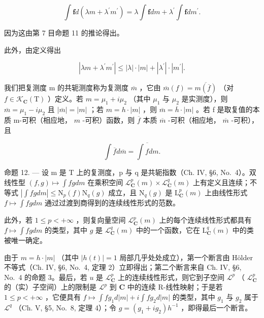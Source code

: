 \[
\int \mathbf {f} d (\lambda m + \lambda^ {\prime} m ^ {\prime}) = \lambda \int \mathbf {f} d m + \lambda^ {\prime} \int \mathbf {f} d m ^ {\prime}.
\]

因为这由第 7 目命题 11 的推论得出。

此外，由定义得出

\[
\left| \lambda m + \lambda^ {\prime} m ^ {\prime} \right| \leqslant \left| \lambda \right| \cdot \left| m \right| + \left| \lambda^ {\prime} \right| \cdot \left| m ^ {\prime} \right|.
\]

我们把复测度 m 的共轭测度称为复测度 \(\overline{m}\) ，它由 \(\overline{m}(f) = \overline{m(\overline{f})}\) （对 \(f \in \mathcal{K}_{\mathbf{C}}(\mathrm{T})\) ）定义。若 \(m = \mu_{1} + i\mu_{2}\) （其中 \(\mu_{1}\) 与 \(\mu_{2}\) 是实测度），则 \(\overline{m} = \mu_{1} - i\mu_{2}\) 且 \(|\overline{m}| = |m|\) ；若 \(m = h \cdot |m|\) ，则 \(\overline{m} = \overline{h} \cdot |m|\) 。若 f 是取复值的本质 m-可积（相应地， \(m\) -可积）函数，则 \(\overline{f}\) 本质 \(\overline{m}\) -可积（相应地， \(\overline{m}\) -可积），且

\[
\int \overline {{f}} d \overline {{m}} = \overline {{\int f d m}}.
\]

命题 12. --- 设 m 是 T 上的复测度，p 与 q 是共轭指数（Ch. IV, §6, No.~4）。双线性型 \((f,g)\mapsto\int fg dm\) 在乘积空间 \(\mathcal{L}_{\mathbf{C}}^{p}(m)\times\mathcal{L}_{\mathbf{C}}^{q}(m)\) 上有定义且连续；不等式 \(\left|\int fg dm\right|\leqslant\mathrm{N}_{p}(f)\mathrm{N}_{q}(g)\) 成立，且 \(\mathrm{N}_{q}(g)\) 是 \(\mathrm{L}_{\mathbf{C}}^{p}(m)\) 上由线性形式 \(f\mapsto\int fg dm\) 通过过渡到商得到的连续线性形式的范数。

此外，若 \(1 \leqslant p < +\infty\) ，则复向量空间 \(\mathcal{L}_{\mathbf{C}}^{p}(m)\) 上的每个连续线性形式都具有 \(f \mapsto \int fg dm\) 的类型，其中 \(g\) 是 \(\mathcal{L}_{\mathbf{C}}^{q}(m)\) 中的一个函数，它在 \(\mathrm{L}_{\mathbf{C}}^{q}(m)\) 中的类被唯一确定。

由于 \(m = h \cdot |m|\) （其中 \(|h(t)| = 1\) 局部几乎处处成立），第一个断言由 Hölder 不等式（Ch. IV, §6, No.~4, 定理 2）立即得出；第二个断言来自 Ch. IV, §6, No.~4 的命题 3。最后，若 \(u\) 是 \(\mathcal{L}_{\mathbf{C}}^{p}\) 上的连续线性形式，则它到子空间 \(\mathcal{L}^p\) （ \(\mathcal{L}_{\mathbf{C}}^{p}\) 的（实）子空间）上的限制是 \(\mathcal{L}^p\) 到 \(\mathbf{C}\) 中的连续 R-线性映射；于是若 \(1 \leqslant p < +\infty\) ，它便具有 \(f \mapsto \int fg_1 d|m| + i \int fg_2 d|m|\) 的类型，其中 \(g_1\) 与 \(g_2\) 属于 \(\mathcal{L}^q\) （Ch. V, §5, No.~8, 定理 4）；令 \(g = (g_1 + ig_2)h^{-1}\) ，即得最后一个断言。


